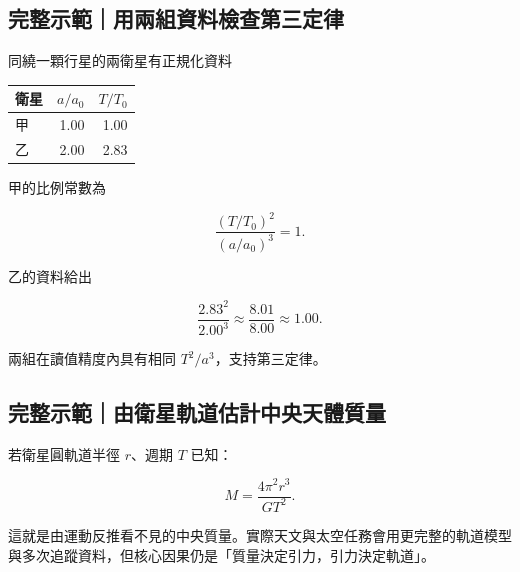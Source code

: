 \documentclass[11pt,a4paper]{article}
\newcounter{none}
\begin{document}
\begin{HandoutWorkedExample}

\subsection{完整示範｜用兩組資料檢查第三定律}\label{ux5b8cux6574ux793aux7bc4ux7528ux5169ux7d44ux8cc7ux6599ux6aa2ux67e5ux7b2cux4e09ux5b9aux5f8b}

同繞一顆行星的兩衛星有正規化資料

{\def\LTcaptype{none} %
\begin{longtable}[]{@{}lrr@{}}
\toprule\noalign{}
衛星 & \(a/a_0\) & \(T/T_0\) \\
\midrule\noalign{}
\endhead
\bottomrule\noalign{}
\endlastfoot
甲 & 1.00 & 1.00 \\
乙 & 2.00 & 2.83 \\
\end{longtable}
}

甲的比例常數為

\[
\frac{(T/T_0)^2}{(a/a_0)^3}=1.
\]

乙的資料給出

\[
\frac{2.83^2}{2.00^3}
\approx\frac{8.01}{8.00}
\approx1.00.
\]

兩組在讀值精度內具有相同 \(T^2/a^3\)，支持第三定律。

\end{HandoutWorkedExample}

\begin{HandoutWorkedExample}

\subsection{完整示範｜由衛星軌道估計中央天體質量}\label{ux5b8cux6574ux793aux7bc4ux7531ux885bux661fux8eccux9053ux4f30ux8a08ux4e2dux592eux5929ux9ad4ux8ceaux91cf}

若衛星圓軌道半徑 \(r\)、週期 \(T\) 已知：

\[
\boxed{M=\frac{4\pi^2r^3}{GT^2}}.
\]

這就是由運動反推看不見的中央質量。實際天文與太空任務會用更完整的軌道模型與多次追蹤資料，但核心因果仍是「質量決定引力，引力決定軌道」。

\end{HandoutWorkedExample}
\end{document}

